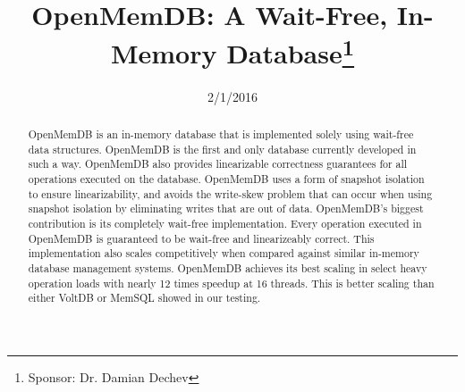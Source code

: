 \documentclass[conference, compsoc]{IEEEtran}
\begin{document}
\title{OpenMemDB: A Wait-Free, In-Memory Database\thanks{Sponsor: Dr. Damian Dechev}}
\author{
 \and 
{} \and 
{} \and 
{}
}

\date{2/1/2016}

\maketitle
\newpage

\begin{abstract}
OpenMemDB is an in-memory database that is implemented solely using wait-free
data structures. OpenMemDB is the first and only database currently developed in such a
way. OpenMemDB also provides linearizable correctness guarantees for all operations
executed on the database. OpenMemDB uses a form of snapshot isolation to ensure 
linearizability, and avoids the write-skew problem that can occur when using
snapshot isolation by eliminating writes that are out of data. 
OpenMemDB's biggest contribution is its completely wait-free 
implementation. Every operation executed in OpenMemDB is guaranteed to be wait-free 
and linearizeably correct. This implementation also scales competitively when compared 
against similar in-memory database management systems.
OpenMemDB achieves its best scaling in select heavy operation loads with nearly 
12 times speedup at 16 threads. This is better scaling than either VoltDB or MemSQL showed
in our testing. 
\end{abstract}
\end{document}
